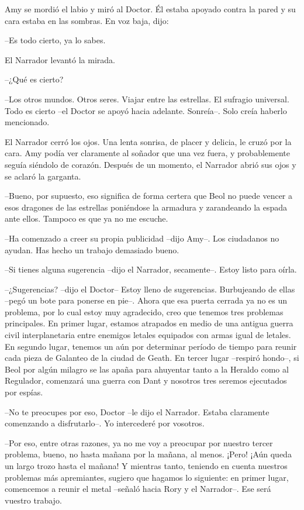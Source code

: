 {Amy se mordió el labio y miró al Doctor. Él estaba apoyado contra la
pared y su cara estaba en las sombras. En voz baja, dijo:}

{--Es todo cierto, ya lo sabes.}

{El Narrador levantó la mirada.}

{--¿Qué es cierto?}

{--Los otros mundos. Otros seres. Viajar entre las estrellas. El
	sufragio universal. Todo es cierto --el Doctor se apoyó hacia adelante.
Sonreía--. Solo creía haberlo mencionado.}

{El Narrador cerró los ojos. Una lenta sonrisa, de placer y delicia, le
	cruzó por la cara. Amy podía ver claramente al soñador que una vez
	fuera, y probablemente seguía siéndolo de corazón. Después de un
momento, el Narrador abrió sus ojos y se aclaró la garganta.}

{--Bueno, por supuesto, eso significa de forma certera que Beol no
	puede vencer a esos dragones de las estrellas poniéndose la armadura y
zarandeando la espada ante ellos. Tampoco es que ya no me escuche.}

{--Ha comenzado a creer su propia publicidad --dijo Amy--. Los
ciudadanos no ayudan. Has hecho un trabajo demasiado bueno.}

{--Si tienes alguna sugerencia --dijo el Narrador, secamente--. Estoy
listo para oírla.}

{--¿Sugerencias? --dijo el Doctor-- Estoy lleno de sugerencias.
	Burbujeando de ellas --pegó un bote para ponerse en pie--. Ahora que esa
	puerta cerrada ya no es un problema, por lo cual estoy muy agradecido,
	creo que tenemos tres problemas principales. En primer lugar, estamos
	atrapados en medio de una antigua guerra civil interplanetaria entre
	enemigos letales equipados con armas igual de letales. En segundo lugar,
	tenemos un aún por determinar período de tiempo para reunir cada pieza
	de Galanteo de la ciudad de Geath. En tercer lugar --respiró hondo--, si
	Beol por algún milagro se las apaña para ahuyentar tanto a la Heraldo
	como al Regulador, comenzará una guerra con Dant y nosotros tres seremos
ejecutados por espías.}

{--No te preocupes por eso, Doctor --le dijo el Narrador. Estaba
claramente comenzando a disfrutarlo--. Yo intercederé por vosotros.}

{--Por eso, entre otras razones, ya no me voy a preocupar por nuestro
	tercer problema, bueno, no hasta mañana por la mañana, al menos. ¡Pero!
	¡Aún queda un largo trozo hasta el mañana! Y mientras tanto, teniendo en
	cuenta nuestros problemas más apremiantes, sugiero que hagamos lo
	siguiente: en primer lugar, comencemos a reunir el metal --señaló hacia
Rory y el Narrador--. Ese será vuestro trabajo.}

